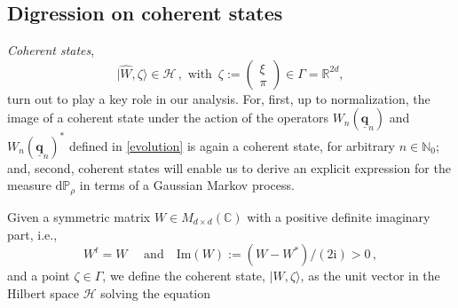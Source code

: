 \documentclass[12pt]{article}
\renewcommand\i{\mathrm{i}}
\renewcommand{\d}{{\mathrm d}}
\begin{document}
\subsection{Digression on coherent states}\label{coh-states}
\textit{Coherent states}, 
$$\vert \widehat{W}, \zeta \rangle \in \mathcal{H}\,,  \text{ with  }\,
\zeta := \begin{pmatrix} \xi \\ \pi \end{pmatrix} \in \Gamma =\mathbb{R}^{2d} ,$$
 turn out to play a key role in our analysis. For, first, up to normalization, the image of a coherent state under the action of the operators $W_{n}(\underline{\mathbf{q}}_n)$ and $W_{n}(\underline{\mathbf{q}}_n)^{*}$ defined in \eqref{evolution} is again a coherent state, for arbitrary $n\in \mathbb{N}_0$; and, second, coherent states will enable us to derive an explicit expression for the measure $\d\mathbb{P}_{\rho}$ in terms of a Gaussian Markov process.

Given a symmetric matrix $W \in M_{d \times d}(\mathbb{C})$ with a positive definite imaginary part, i.e.,
\begin{equation}\label{squeeze}
W^t = W\quad \text{ and} \quad \mathrm{Im}(W):=(W -W^*)/(2 \i) > 0\,,
\end{equation}
and a point $\zeta\in \Gamma$, we define the coherent state, $\vert W, \zeta \rangle$, as the unit vector in the Hilbert space $\mathcal{H}$ solving the equation
\end{document}
